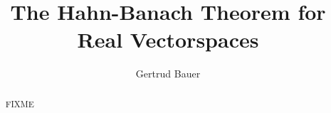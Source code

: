 \documentclass[11pt,a4paper]{article}
\begin{document}
\title{The Hahn-Banach Theorem for Real Vectorspaces}
\author{Gertrud Bauer}
\maketitle

\begin{abstract}
  FIXME
\end{abstract}

\tableofcontents


\end{document}
